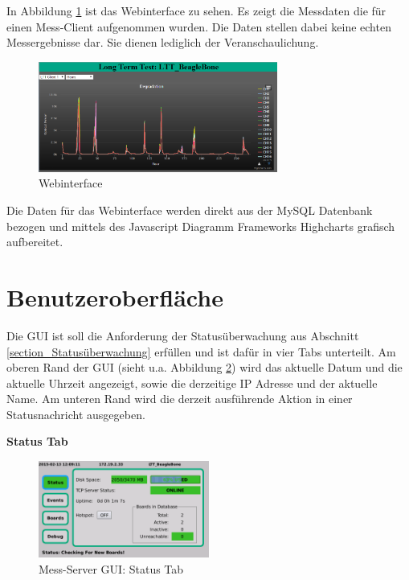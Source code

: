 In Abbildung \ref{figure_Webinterface} ist das Webinterface zu sehen. Es zeigt die Messdaten die für einen Mess-Client aufgenommen wurden. Die Daten stellen dabei keine echten Messergebnisse dar. Sie dienen lediglich der Veranschaulichung.

\begin{figure}[H]
\begin{center}
\includegraphics[width=0.7\textwidth ]{img/general/Webinterface.png}
\caption{Webinterface}
\label{figure_Webinterface}
\end{center}
\end{figure}

Die Daten für das Webinterface werden direkt aus der MySQL Datenbank bezogen und mittels des Javascript Diagramm Frameworks Highcharts \cite{highcharts} grafisch aufbereitet.

\newpage
\section{Benutzeroberfläche}
Die \ac{GUI} ist soll die Anforderung der Statusüberwachung aus Abschnitt \ref{section_Statusüberwachung} erfüllen und ist dafür in vier Tabs unterteilt. Am oberen Rand der \ac{GUI} (sieht u.a. Abbildung \ref{figure_MessServerGUIStatus}) wird das aktuelle Datum und die aktuelle Uhrzeit angezeigt, sowie die derzeitige IP Adresse und der aktuelle Name. Am unteren Rand wird die derzeit ausführende Aktion in einer Statusnachricht ausgegeben.

\textbf{Status Tab}

\begin{figure}[H]
\begin{center}
\includegraphics[width=0.5\textwidth ]{img/GUI/Server_GUI_Status1.png}
\caption{Mess-Server GUI: Status Tab}
\label{figure_MessServerGUIStatus}
\end{center}
\end{figure}

